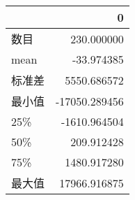 \begin{tabular}{lr}
\toprule
{} &             0 \\
\midrule
数目 &    230.000000 \\
mean  &    -33.974385 \\
标准差   &   5550.686572 \\
最小值   & -17050.289456 \\
25\%   &  -1610.964504 \\
50\%   &    209.912428 \\
75\%   &   1480.917280 \\
最大值   &  17966.916875 \\
\bottomrule
\end{tabular}
